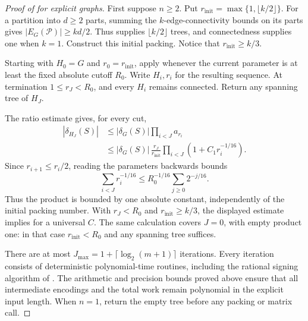 \begin{proof}[Proof of  for explicit graphs]
First suppose $n\ge2$. Put
$r_{\mathrm{init}}=\max\{1,\lfloor k/2\rfloor\}$.
For a partition into $d\ge2$ parts, summing the $k$-edge-connectivity
bounds on its parts gives $|E_G(\mathcal P)|\ge kd/2$.
Thus  supplies
$\lfloor k/2\rfloor$ trees, and connectedness supplies one when $k=1$.
Construct this initial packing. Notice that
$r_{\mathrm{init}}\ge k/3$.

Starting with $H_0=G$ and $r_0=r_{\mathrm{init}}$, apply
 whenever the current parameter is at least
the fixed absolute cutoff $R_0$. Write $H_i,r_i$ for the resulting
sequence.
At termination $1\le r_J<R_0$, and every $H_i$ remains connected.
Return any spanning tree of $H_J$.

The ratio estimate gives, for every cut,
\begin{align*}
 |\delta_{H_J}(S)|
 &\le |\delta_G(S)|\prod_{i<J}a_{r_i}\\
 &\le |\delta_G(S)|\,\frac{r_J}{r_{\mathrm{init}}}
                           \prod_{i<J}(1+C_1r_i^{-1/16}).
\end{align*}
Since $r_{i+1}\le r_i/2$, reading the parameters backwards bounds
\[
 \sum_{i<J}r_i^{-1/16}
       \le R_0^{-1/16}\sum_{j\ge0}2^{-j/16}.
\]
Thus the product is bounded by one absolute constant, independently of
the initial packing number. With $r_J<R_0$ and
$r_{\mathrm{init}}\ge k/3$, the displayed estimate implies
 for a universal $C$. The same calculation covers
$J=0$, with empty product one: in that case
$r_{\mathrm{init}}<R_0$ and any spanning tree suffices.

There are at most $J_{\max}=1+\lceil\log_2(m+1)\rceil$ iterations.
Every iteration consists of deterministic polynomial-time routines,
including the rational signing algorithm of .
The arithmetic and precision bounds proved above ensure that all
intermediate encodings and the total work remain polynomial in the
explicit input length.
When $n=1$, return the empty tree before any packing or matrix call.
\end{proof}

